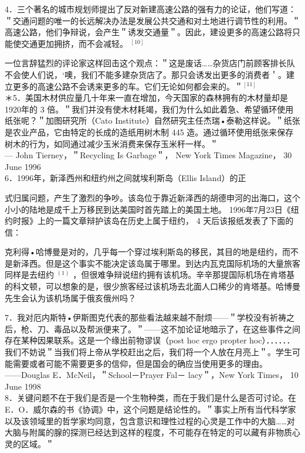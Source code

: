 4．三个著名的城市规划师提出了反对新建高速公路的强有力的论证，他们写道：＂交通问题的唯一的长远解决办法是发展公共交通和对土地进行调节性的利用。＂高速公路，他们争辩说，会产生＂诱发交通量＂。因此，建设更多的高速公路将只能使交通更加拥挤，而不会减轻。 ${ }^{[10]}$

一位言辞猛烈的评论家这样回击这个观点：＂这是废话……杂货店门前顾客排长队不会使人们说，‘噢，我们不能多建杂货店了。那只会诱发出更多的消费者＇。建立更多的高速公路不会诱来更多的车。它们无论如何都会来的。＂${ }^{[11]}$\\
＊5．美国木材供应量几十年来一直在增加，今天国家的森林拥有的木材量却是1920年的 3 倍。＂我们并没有使木材耗竭，我们为什么如此着急、希望循环使用纸张呢？＂加图研究所（Cato Institute）自然研究主任杰瑞•泰勒这样说。＂纸张是农业产品，它由特定的长成的造纸用树木制 445 造。通过循环使用纸张来保存树木的行为，如同通过减少玉米消费来保存玉米秆一样。＂\\
— John Tierney，＂Recycling Is Garbage＂， New York Times Magazine， 30 June 1996\\
6．1996年，新泽西州和纽约州之间就埃利斯岛（Ellis Island）的正

式归属问题，产生了激烈的争吵。该岛位于靠近新泽西的胡德申河的出海口，这个小小的陆地是成千上万移民到达美国时首先踏上的美国土地。 1996年7月23日《纽约时报》上的一篇文章辩护该岛在历史上属于纽约， 4 天后该报纸发表了下面的信：

克利得•哈博曼是对的，几乎每一个穿过埃利斯岛的移民，其目的地是纽约，而不是新泽西。但是这个事实不能决定该岛属于哪里。到达内瓦克国际机场的大量旅客同样是去纽约 ${ }^{(1)}$ ，但很难争辩说纽约拥有该机场。辛辛那提国际机场在肯塔基的科文顿，可以想象的是，很少旅客经过该机场去北面人口稀少的肯塔基。哈博曼先生会认为该机场属于俄亥俄州吗？

7．我对厄内斯特•伊斯图克代表的那些看法越来越不耐烦——＂学校没有祈祷之后，枪、刀、毒品以及帮派便来了。＂——这不加论证地暗示了，在这些事件之间存在某种因果联系。这是一个缘出前物谬误（post hoc ergo propter hoc）．．．．．．我们不妨说＂当我们将上帝从学校赶出之后，我们将一个人放在月亮上＂。学生可能需要或者可能不需要更多的信仰，但是国会的确应当使用更多的理由。\\
——Douglas E．McNeil，＂School－Prayer Fal－ lacy＂，New York Times， 10 June 1998\\
8．关键问题不在于我们是否是一个生物种类，而在于我们是什么是否可讨论。在 E．O．威尔森的书《协调》中，这个问题是结论性的。＂事实上所有当代科学家以及该领域里的哲学家均同意，包含意识和理性过程的心灵是工作中的大脑……对大脑与附属的腺的探测已经达到这样的程度，不可能存在特定的可以藏有非物质心灵的区域。＂

